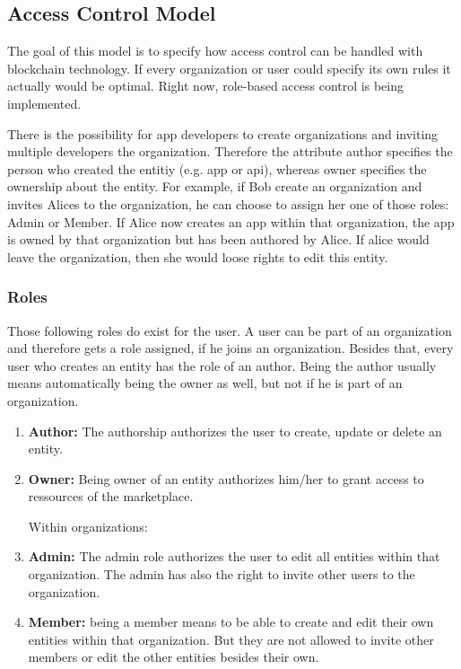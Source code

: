 \subsection{Access Control Model}

The goal of this model is to specify how access control can be handled with blockchain technology. If every organization or user could specify its own rules it actually would be optimal. Right now, role-based access control is being implemented. 

There is the possibility for app developers to create organizations and inviting multiple developers the organization. Therefore the attribute author specifies the person who created the entitiy (e.g. app or api), whereas owner specifies the ownership about the entity. For example, if Bob create an organization and invites Alices to the organization, he can choose to assign her one of those roles: Admin or Member. If Alice now creates an app within that organization, the app is owned by that organization but has been authored by Alice. If alice would leave the organization, then she would loose rights to edit this entity. 

\subsubsection{Roles} 
Those following roles do exist for the user. A user can be part of an organization and therefore gets a role assigned, if he joins an organization. Besides that, every user who creates an entity has the role of an author. Being the author usually means automatically being the owner as well, but not if he is part of an organization. 

\begin{enumerate}
    \item \textbf{Author:} The authorship authorizes the user to create, update or delete an entity.

    \item \textbf{Owner:} Being owner of an entity authorizes him/her to grant access to ressources of the marketplace. 

Within organizations: 

    \item \textbf{Admin:} The admin role authorizes the user to edit all entities within that organization. The admin has also the right to invite other users to the organization. 
    
    \item \textbf{Member:} being a member means to be able to create and edit their own entities within that organization. But they are not allowed to invite other members or edit the other entities besides their own. 
\end{enumerate}

